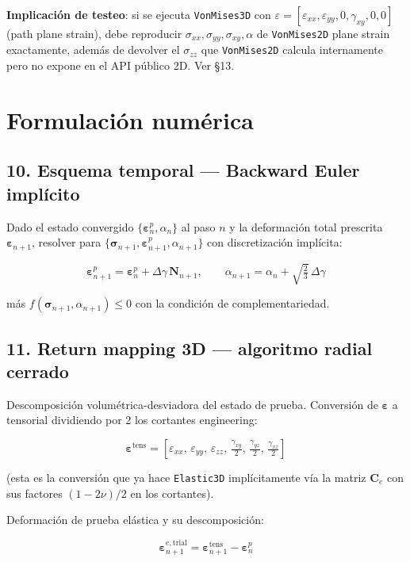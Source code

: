 \documentclass[11pt,letterpaper,oneside]{report}
\begin{document}
\textbf{Implicación de testeo}: si se ejecuta \texttt{VonMises3D} con $\varepsilon = [\varepsilon_{xx}, \varepsilon_{yy}, 0, \gamma_{xy}, 0, 0]$ (path plane strain), debe reproducir $\sigma_{xx}, \sigma_{yy}, \sigma_{xy}, \alpha$ de \texttt{VonMises2D} plane strain exactamente, además de devolver el $\sigma_{zz}$ que \texttt{VonMises2D} calcula internamente pero no expone en el API público 2D. Ver §13.


\section{Formulación numérica}

\subsection{10. Esquema temporal --- Backward Euler implícito}

Dado el estado convergido $\{\boldsymbol\varepsilon^p_n, \alpha_n\}$ al paso $n$ y la deformación total prescrita $\boldsymbol\varepsilon_{n+1}$, resolver para $\{\boldsymbol\sigma_{n+1}, \boldsymbol\varepsilon^p_{n+1}, \alpha_{n+1}\}$ con discretización implícita:

\[
\boldsymbol\varepsilon^p_{n+1} = \boldsymbol\varepsilon^p_n + \Delta\gamma\,\mathbf N_{n+1}, \qquad \alpha_{n+1} = \alpha_n + \sqrt{\tfrac{2}{3}}\,\Delta\gamma
\]

más $f(\boldsymbol\sigma_{n+1}, \alpha_{n+1}) \leq 0$ con la condición de complementariedad.

\subsection{11. Return mapping 3D --- algoritmo radial cerrado}

Descomposición volumétrica-desviadora del estado de prueba. Conversión de $\boldsymbol\varepsilon$ a tensorial dividiendo por 2 los cortantes engineering:

\[
\boldsymbol\varepsilon^\text{tens} = [\varepsilon_{xx},\,\varepsilon_{yy},\,\varepsilon_{zz},\,\tfrac{\gamma_{xy}}{2},\,\tfrac{\gamma_{yz}}{2},\,\tfrac{\gamma_{xz}}{2}]
\]

(esta es la conversión que ya hace \texttt{Elastic3D} implícitamente vía la matriz $\mathbf C_e$ con sus factores $(1-2\nu)/2$ en los cortantes).

Deformación de prueba elástica y su descomposición:

\[
\boldsymbol\varepsilon^{e,\text{trial}}_{n+1} = \boldsymbol\varepsilon^\text{tens}_{n+1} - \boldsymbol\varepsilon^p_n
\]
\end{document}
